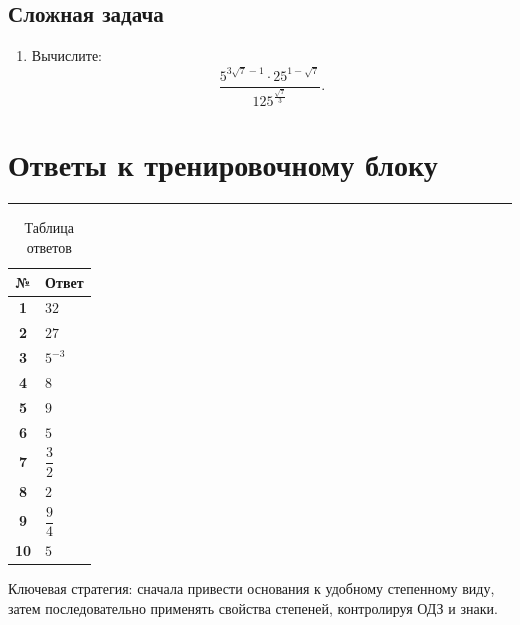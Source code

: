 \documentclass[a4paper,12pt]{article}
\newcommand{\lessonrule}{%
  \par\vspace{0.3em}
  {\color{accent}\rule{\linewidth}{0.6pt}}
  \vspace{0.5em}
}
\begin{document}
\subsection*{\color{accent}Сложная задача}

\begin{enumerate}[label=\textbf{\arabic*.},start=10]

\item Вычислите:
\[
\frac{
5^{3\sqrt7-1}
\cdot
25^{1-\sqrt7}
}{
125^{\frac{\sqrt7}{3}}
}.
\]

\end{enumerate}

\clearpage

\section*{\color{darkaccent}Ответы к тренировочному блоку}
\lessonrule

\begin{table}[ht]
\centering
\caption{Таблица ответов}
\renewcommand{\arraystretch}{1.4}
\begin{tabularx}{0.72\linewidth}{@{}>{\bfseries}c X@{}}
\toprule
№ & Ответ \\
\midrule
1 & \(32\) \\
2 & \(27\) \\
3 & \(5^{-3}\) \\
4 & \(8\) \\
5 & \(9\) \\
6 & \(5\) \\
7 & \(\dfrac32\) \\
8 & \(2\) \\
9 & \(\dfrac94\) \\
10 & \(5\) \\
\bottomrule
\end{tabularx}
\end{table}

\vfill

\begin{center}
{\color{softgray}\small
Ключевая стратегия:
сначала привести основания к удобному степенному виду,
затем последовательно применять свойства степеней,
контролируя ОДЗ и знаки.}
\end{center}
\end{document}
